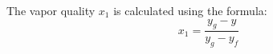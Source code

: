 The vapor quality \( x_1 \) is calculated using the formula:  
\[
x_1 = \frac{y_g - y}{y_g - y_f}
\]